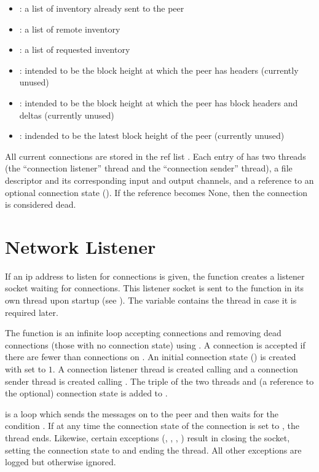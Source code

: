 \begin{itemize}
\item {}: a list of inventory already sent to the peer
\item {}: a list of remote inventory
\item {}: a list of requested inventory
\item {}: intended to be the block height at which the peer has headers (currently unused)
\item {}: intended to be the block height at which the peer has block headers and deltas (currently unused)
\item {}: indended to be the latest block height of the peer (currently unused)
\end{itemize}

All current connections are stored in the ref list {}.
Each entry of {}
has two threads (the ``connection listener'' thread and the ``connection sender'' thread), a file descriptor and its corresponding input and output channels,
and a reference to an optional connection state ({}).
If the reference becomes None, then the connection is considered dead.

\section{Network Listener}

If an ip address to listen for connections is given, the function {}
creates a listener socket waiting for connections.
This listener socket is sent to the function {} in its own thread
upon startup (see {}).
The variable {} contains the thread in case it is required later.

The function {} is an infinite loop accepting connections
and
removing dead connections (those with no connection state) using {}.
A connection is accepted if there are fewer than {} connections on {}.
An initial connection state ({}) is created with {} set to $1$.
A connection listener thread is created calling {}
and a connection sender thread is created calling {}.
The triple of the two threads and (a reference to the optional) connection state is added to {}.

{} is a loop which 
sends the messages on {} to the peer
and then waits for the condition {}.
If at any time the connection state of the connection is set to {},
the thread ends.
Likewise, certain exceptions ({}, {}, {}, {})
result in closing the socket, setting the connection state to {} and ending the thread.
All other exceptions are logged but otherwise ignored.

